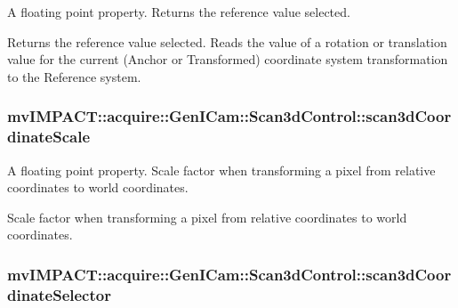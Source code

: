 A floating point property. Returns the reference value selected. 

Returns the reference value selected. Reads the value of a rotation or translation value for the current (Anchor or Transformed) coordinate system transformation to the Reference system. \hypertarget{classmv_i_m_p_a_c_t_1_1acquire_1_1_gen_i_cam_1_1_scan3d_control_ac68bf07316b5f192b6802f5969f9289b}{
\subsubsection[{scan3d\+Coordinate\+Scale}]{ mv\+I\+M\+P\+A\+C\+T\+::acquire\+::\+Gen\+I\+Cam\+::\+Scan3d\+Control\+::scan3d\+Coordinate\+Scale}}\label{classmv_i_m_p_a_c_t_1_1acquire_1_1_gen_i_cam_1_1_scan3d_control_ac68bf07316b5f192b6802f5969f9289b}


A floating point property. Scale factor when transforming a pixel from relative coordinates to world coordinates. 

Scale factor when transforming a pixel from relative coordinates to world coordinates. \hypertarget{classmv_i_m_p_a_c_t_1_1acquire_1_1_gen_i_cam_1_1_scan3d_control_a5835e12ee49c81f5e8a45a71c9f3f307}{
\subsubsection[{scan3d\+Coordinate\+Selector}]{ mv\+I\+M\+P\+A\+C\+T\+::acquire\+::\+Gen\+I\+Cam\+::\+Scan3d\+Control\+::scan3d\+Coordinate\+Selector}}\label{classmv_i_m_p_a_c_t_1_1acquire_1_1_gen_i_cam_1_1_scan3d_control_a5835e12ee49c81f5e8a45a71c9f3f307}


